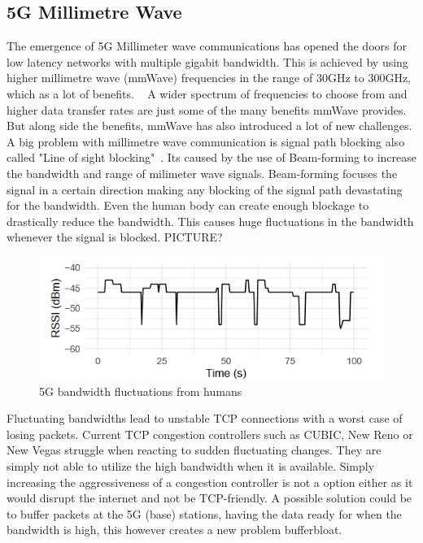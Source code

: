 \documentclass[a4paper,english, 11pt]{report}
\begin{document}
\subsection{5G Millimetre Wave}
The emergence of 5G Millimeter wave communications has opened the doors for low latency networks with multiple gigabit bandwidth. This is achieved by using higher millimetre wave (mmWave) frequencies in the range of 30GHz to 300GHz, which as a lot of benefits. ~\cite{Agrawal_Sharma_2016} A wider spectrum of frequencies to choose from and higher data transfer rates are just some of the many benefits mmWave provides. But along side the benefits, mmWave has also introduced a lot of new challenges.\\

A big problem with millimetre wave communication is signal path blocking also called "Line of sight blocking"~\cite{mmwave_blocking}. Its caused by the use of Beam-forming to increase the bandwidth and range of milimeter wave signals. Beam-forming focuses the signal in a certain direction making any blocking of the signal path devastating for the bandwidth. Even the human body can create enough blockage to drastically reduce the bandwidth. This causes huge fluctuations in the bandwidth whenever the signal is blocked. PICTURE?\\
\begin{figure} %
	\centering
	\includegraphics[scale=1.25]{../diagrams/graphs/tcp_mmwave_blockage.png}
  	\caption{5G bandwidth fluctuations from humans}
  	\label{fig:blockage}
\end{figure}

Fluctuating bandwidths lead to unstable TCP connections with a worst case of losing packets. Current TCP congestion controllers such as CUBIC, New Reno or New Vegas struggle when reacting to sudden fluctuating changes. They are simply not able to utilize the high bandwidth when it is available. Simply increasing the aggressiveness of a congestion controller is not a option either as it would disrupt the internet and not be TCP-friendly. A possible solution could be to buffer packets at the 5G (base) stations, having the data ready for when the bandwidth is high, this however creates a new problem bufferbloat.
\end{document}
